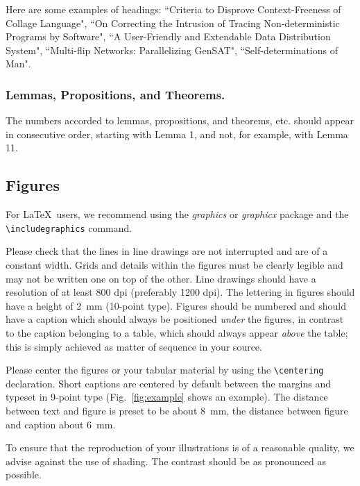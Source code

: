 \documentclass[runningheads,a4paper]{llncs}
\begin{document}
Here are some examples of headings: ``Criteria to Disprove
Context-Freeness of Collage Language", ``On Correcting the Intrusion of
Tracing Non-deterministic Programs by Software", ``A User-Friendly and
Extendable Data Distribution System", ``Multi-flip Networks:
Parallelizing GenSAT", ``Self-determinations of Man".

\subsubsection{Lemmas, Propositions, and Theorems.}

The numbers accorded to lemmas, propositions, and theorems, etc. should
appear in consecutive order, starting with Lemma 1, and not, for
example, with Lemma 11.

\subsection{Figures}

For \LaTeX\ users, we recommend using the \emph{graphics} or \emph{graphicx}
package and the \verb+\includegraphics+ command.

Please check that the lines in line drawings are not
interrupted and are of a constant width. Grids and details within the
figures must be clearly legible and may not be written one on top of
the other. Line drawings should have a resolution of at least 800 dpi
(preferably 1200 dpi). The lettering in figures should have a height of
2~mm (10-point type). Figures should be numbered and should have a
caption which should always be positioned \emph{under} the figures, in
contrast to the caption belonging to a table, which should always appear
\emph{above} the table; this is simply achieved as matter of sequence in
your source.

Please center the figures or your tabular material by using the \verb+\centering+
declaration. Short captions are centered by default between the margins
and typeset in 9-point type (Fig.~\ref{fig:example} shows an example).
The distance between text and figure is preset to be about 8~mm, the
distance between figure and caption about 6~mm.

To ensure that the reproduction of your illustrations is of a reasonable
quality, we advise against the use of shading. The contrast should be as
pronounced as possible.
\end{document}
